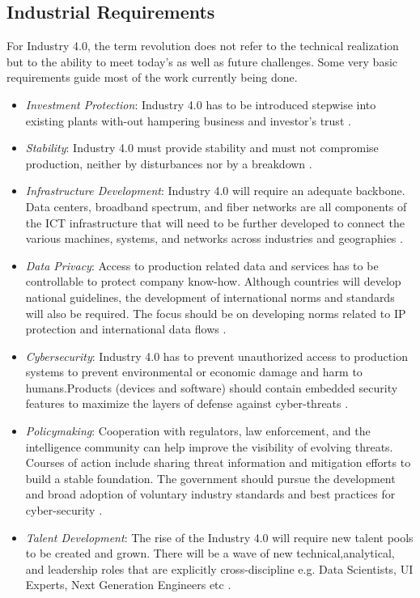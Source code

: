 \subsection{Industrial Requirements}
For Industry 4.0, the term revolution does not refer to the technical realization but to the ability to meet today’s as well as future challenges. Some very basic requirements guide most of the work currently being done.
\begin{itemize}
	\item \textit{Investment Protection}: Industry 4.0 has to be introduced stepwise into existing plants with-out hampering business and investor's trust \cite{IN4HYPE,IN4BCG}.
	\item \textit{Stability}: Industry 4.0 must provide stability and must not compromise production, neither by disturbances nor by a breakdown \cite{IN4HYPE}.
	\item \textit{Infrastructure Development}: Industry 4.0 will require an	adequate backbone. Data centers, broadband spectrum, and fiber networks are all components of the ICT infrastructure that will need to be further developed to connect the various machines, systems, and networks across industries and geographies \cite{INDUSINTERNET}.
	\item \textit{Data Privacy}: Access to production related data and services has to be controllable to protect company	know-how. Although	countries will develop national guidelines, the development of international norms and	standards will also be required. The focus	should be on developing norms related to IP protection and international data flows \cite{IN4HYPE,INDUSINTERNET}.
	\item \textit{Cybersecurity}: Industry 4.0 has to prevent unauthorized access to production systems to prevent environmental or economic damage and harm to humans.Products	(devices and software) should contain embedded security features to maximize the layers of defense against cyber-threats \cite{IN4HYPE,INDUSINTERNET}.
	\item \textit{Policymaking}: Cooperation with regulators, law enforcement, and the intelligence community can help improve the visibility of evolving threats. Courses of action include sharing threat information and mitigation efforts to build a stable foundation. The government should pursue the development and broad
	adoption of voluntary industry standards and best practices for cyber-security \cite{INDUSINTERNET}.
	\item \textit{Talent Development}: The rise of the Industry 4.0 will require new talent pools to be created and grown. There will be a wave of new technical,analytical, and leadership roles that are	explicitly cross-discipline e.g. Data Scientists, UI Experts, Next Generation Engineers etc \cite{INDUSINTERNET}.

\end{itemize}

